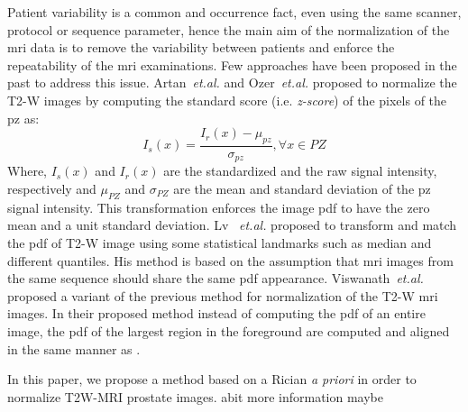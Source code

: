 Patient variability is a common and occurrence fact, even using the same scanner, protocol or sequence parameter, hence the main aim of the normalization of the \ac{mri} data is to remove the variability between patients and enforce the repeatability of the \ac{mri} examinations. 
Few approaches have been proposed in the past to address this issue. 
Artan~\textit{et.al.}\cite{artan2010prostate,artan2009prostate} and Ozer~\textit{et.al.} proposed to normalize the T2-W images by computing the standard score (i.e. \textit{z-score}) of the pixels of the \ac{pz} as: 
\begin{equation}
	I_{s}(x) = \frac{I_{r}(x)- \mu_{pz}}{\sigma_{pz}}, \forall x\in PZ
\end{equation}
\noindent Where, $I_{s}(x)$ and $I_{r}(x)$ are the standardized and the raw signal intensity, respectively and $\mu_{PZ}$ and $\sigma_{PZ}$ are the mean and standard deviation of the \ac{pz} signal intensity. 
This transformation enforces the image \ac{pdf} to have the zero mean and a unit standard deviation.
Lv ~\textit{et.al.}\cite{lv2009computerized} proposed to transform and match the \ac{pdf} of T2-W image using some statistical landmarks such as median and different quantiles. 
His method is based on the assumption that \ac{mri} images from the same sequence should share the same \ac{pdf} appearance.
Viswanath~\textit{et.al.} \cite{viswanath2012central} proposed a variant of the previous method for normalization of the T2-W \ac{mri} images. 
In their proposed method instead of computing the \ac{pdf} of an entire image, the \ac{pdf} of the largest region in the foreground are computed and aligned in the same manner as \cite{lv2009computerized}.

In this paper, we propose a method based on a Rician \textit{a priori} in order to normalize T2W-MRI prostate images.
{\color{red} abit more information maybe}




